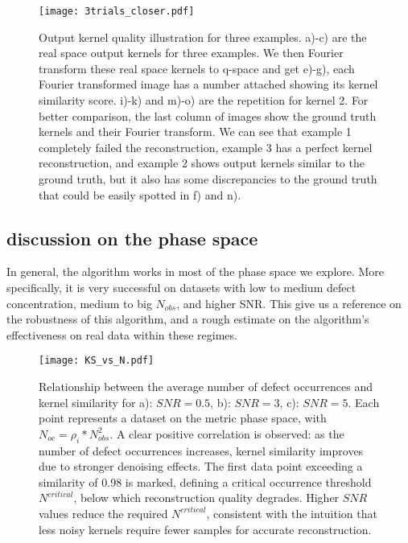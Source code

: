 \begin{figure}
	\texttt{[image: 3trials\_closer.pdf]} 
	\centering
	\caption{Output kernel quality illustration for three examples. a)-c) are the real space output kernels for three examples. We then Fourier transform these real space kernels to q-space and get e)-g), each Fourier transformed image has a number attached showing its kernel similarity score. i)-k) and m)-o) are the repetition for kernel 2. For better comparison, the last column of images show the ground truth kernels and their Fourier transform. We can see that example 1 completely failed the reconstruction, example 3 has a perfect kernel reconstruction, and example 2 shows output kernels similar to the ground truth, but it also has some discrepancies to the ground truth that could be easily spotted in f) and n).}
	\label{fig:regimes_closer}
\end{figure}
 

\subsection{discussion on the phase space}
In general, the algorithm works in most of the phase space we explore. More specifically, it is very successful on datasets with low to medium defect concentration, medium to big $N_{obs}$, and higher SNR. This give us a reference on the robustness of this algorithm, and a rough estimate on the algorithm's effectiveness on real data within these regimes.

\begin{figure}
	\texttt{[image: KS\_vs\_N.pdf]} 
	\centering
	\caption{Relationship between the average number of defect occurrences and kernel similarity for a): $SNR=0.5$, b): $SNR=3$, c): $SNR=5$. Each point represents a dataset on the metric phase space, with $N_{oc} = \rho_i * N_{obs}^2$. A clear positive correlation is observed: as the number of defect occurrences increases, kernel similarity improves due to stronger denoising effects. The first data point exceeding a similarity of 0.98 is marked, defining a critical occurrence threshold $N^{critical}$, below which reconstruction quality degrades. Higher $SNR$ values reduce the required $N^{critical}$, consistent with the intuition that less noisy kernels require fewer samples for accurate reconstruction.}
	\label{fig:KS_vs_N}
\end{figure}

